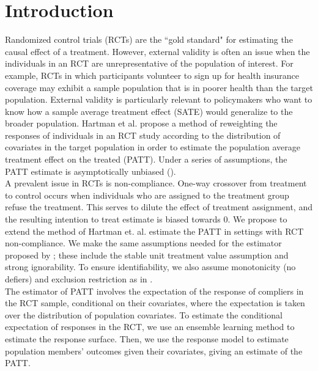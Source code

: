 \documentclass[12pt]{article}
\begin{document}
    
\maketitle  


\vspace{20mm}

\section{Introduction}
Randomized control trials (RCTs) are the ``gold standard" for estimating the causal effect of a treatment.  However, external validity is often an issue when the individuals in an RCT are unrepresentative of the population of interest.  For example, RCTs in which participants volunteer to sign up for health insurance coverage may exhibit a sample population that is in poorer health than the target population.  External validity is particularly relevant to policymakers who want to know how a sample average treatment effect (SATE) would generalize to the broader population. Hartman et al. propose a method of reweighting the responses of individuals in an RCT study according to the distribution of covariates in the target population in order to estimate the population average treatment effect on the treated (PATT).  Under a series of assumptions, the PATT estimate is asymptotically unbiased (\cite{Hartman}). \\

A prevalent issue in RCTs is non-compliance.  One-way crossover from treatment to control occurs when individuals who are assigned to the treatment group refuse the treatment.  This serves to dilute the effect of treatment assignment, and the resulting intention to treat estimate is biased towards $0$.  We propose to extend the method of Hartman et. al. estimate the PATT in settings with RCT non-compliance.  We make the same assumptions needed for the estimator proposed by \cite{Hartman}; these include the stable unit treatment value assumption and strong ignorability.  To ensure identifiability, we also assume monotonicity (no defiers) and exclusion restriction as in \cite{Angrist1996}. \\

The estimator of PATT involves the expectation of the response of compliers in the RCT sample, conditional on their covariates, where the expectation is taken over the distribution of population covariates.  To estimate the conditional expectation of responses in the RCT, we use an ensemble learning method to estimate the response surface.  Then, we use the response model to estimate population members' outcomes given their covariates, giving an estimate of the PATT. \\
\end{document}
